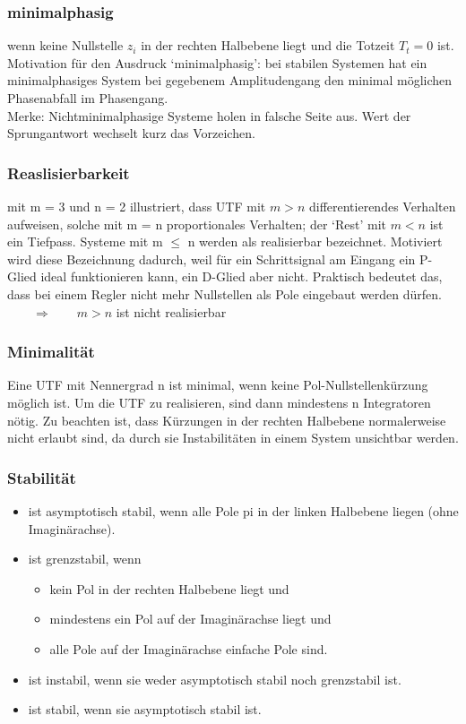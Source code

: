 \subsubsection{minimalphasig}
wenn keine Nullstelle $z_i$ in der rechten Halbebene liegt und die Totzeit $T_t = 0$ ist.
Motivation für den Ausdruck ‘minimalphasig’: bei stabilen Systemen hat ein
minimalphasiges System bei gegebenem Amplitudengang den minimal möglichen
Phasenabfall im Phasengang.\\
Merke: Nichtminimalphasige Systeme holen in falsche Seite aus. Wert der Sprungantwort wechselt kurz das Vorzeichen.

\subsubsection{Reaslisierbarkeit}
mit m = 3 und n = 2 illustriert, dass UTF mit $m > n$ differentierendes Verhalten
aufweisen, solche mit m = n proportionales Verhalten; der ‘Rest’ mit $m < n$ ist
ein Tiefpass. Systeme mit m $\leq$ n werden als realisierbar bezeichnet. Motiviert wird
diese Bezeichnung dadurch, weil für ein Schrittsignal am Eingang ein P-Glied ideal
funktionieren kann, ein D-Glied aber nicht. Praktisch bedeutet das, dass bei einem Regler nicht mehr Nullstellen als Pole
eingebaut werden dürfen. $\qquad \Rightarrow \qquad m > n$ ist nicht realisierbar

\subsubsection{Minimalität}

Eine UTF mit Nennergrad n ist minimal, wenn keine Pol-Nullstellenkürzung
möglich ist. Um die UTF zu realisieren, sind dann mindestens n Integratoren nötig. Zu beachten ist, dass Kürzungen in
der rechten Halbebene normalerweise nicht erlaubt sind, da durch sie Instabilitäten
in einem System unsichtbar werden.

\subsubsection{Stabilität}
\begin{itemize}
\item  ist asymptotisch stabil, wenn
alle Pole pi in der linken Halbebene liegen (ohne Imaginärachse).
\item  ist grenzstabil, wenn
\begin{itemize}
\item kein Pol in der rechten Halbebene liegt und
\item mindestens ein Pol auf der Imaginärachse liegt und
\item alle Pole auf der Imaginärachse einfache Pole sind.
\end{itemize}
\item  ist instabil, wenn
sie weder asymptotisch stabil noch grenzstabil ist.
\item  ist stabil, wenn
sie asymptotisch stabil ist.
\end{itemize}


